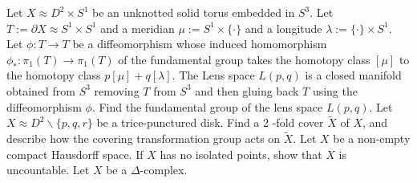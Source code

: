 \documentclass[10pt]{article}
\begin{document}
\newpage
   Let $X \approx D^{2} \times S^{1}$ be an unknotted solid torus embedded in $S^{3}$. Let $T:=\partial X \approx S^{1} \times S^{1}$ and a meridian $\mu:=S^{1} \times\{\cdot\}$ and a longitude $\lambda:=\{\cdot\} \times S^{1}$. Let $\phi: T \rightarrow T$ be a diffeomorphism whose induced homomorphism $\phi_{*}: \pi_{1}(T) \rightarrow \pi_{1}(T)$ of the fundamental group takes the homotopy class $[\mu]$ to the homotopy class $p[\mu]+q[\lambda]$. The Lens space $L(p, q)$ is a closed manifold obtained from $S^{3}$ removing $T$ from $S^{3}$ and then gluing back $T$ using the diffeomorphism $\phi$. Find the fundamental group of the lens space $L(p, q)$.
\newpage
   Let $X \approx D^{2} \backslash\{p, q, r\}$ be a trice-punctured disk. Find a 2 -fold cover $\tilde{X}$ of $X$, and describe how the covering transformation group acts on $\tilde{X}$.
\newpage
   Let $X$ be a non-empty compact Hausdorff space. If $X$ has no isolated points, show that $X$ is uncountable.
\newpage
   Let $X$ be a $\Delta$-complex.
\end{document}
